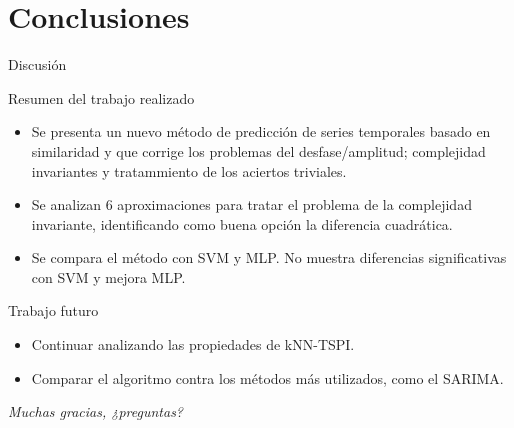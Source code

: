 \documentclass[12pt, aspectratio=169]{beamer} %
\begin{document}
\section{Conclusiones}

\begin{frame}{Discusión}
  \begin{block}{Resumen del trabajo realizado}

    \begin{itemize}
    \item Se presenta un nuevo método de predicción de series temporales basado en similaridad y que corrige los problemas del desfase/amplitud; complejidad invariantes y tratammiento de los aciertos triviales.
    \item Se analizan 6 aproximaciones para tratar el problema de la complejidad invariante, identificando como buena opción la diferencia cuadrática.
    \item Se compara el método con SVM y MLP. No muestra diferencias significativas con SVM y mejora MLP.
    \end{itemize}
  \end{block}

  \begin{block}{Trabajo futuro}
    \begin{itemize}
    \item Continuar analizando las propiedades de kNN-TSPI.
    \item Comparar el algoritmo contra los métodos más utilizados, como el SARIMA.
    \end{itemize}

  \end{block}

\end{frame}


\begin{frame}{}
  \centering \Large
  \emph{Muchas gracias, ¿preguntas?}
\end{frame}
\end{document}
